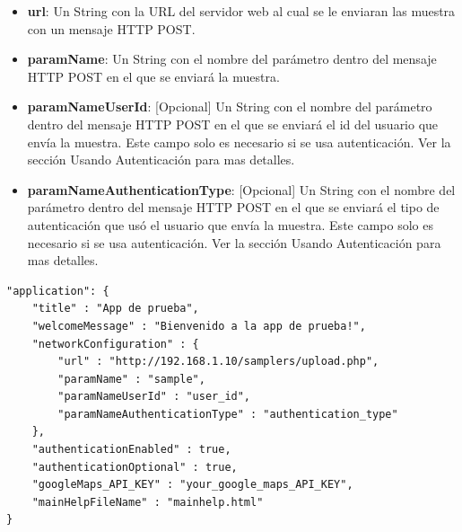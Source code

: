 	\begin{itemize}
	
		\item \textbf{url}: Un String con la URL del servidor web al cual se le enviaran las muestra con un mensaje HTTP POST.
		
		\item \textbf{paramName}: Un String con el nombre del parámetro dentro del mensaje HTTP POST en el que se enviará la muestra.
	
		\item \textbf{paramNameUserId}: [Opcional] Un String con el nombre del parámetro dentro del mensaje HTTP POST en el que se enviará el id del usuario que envía la muestra. Este campo solo es necesario si se usa autenticación. Ver la sección Usando Autenticación para mas detalles.
		
		\item \textbf{paramNameAuthenticationType}: [Opcional] Un String con el nombre del parámetro dentro del mensaje HTTP POST en el que se enviará el tipo de autenticación que usó el usuario que envía la muestra. Este campo solo es necesario si se usa autenticación. Ver la sección Usando Autenticación para mas detalles.
	
	\end{itemize}
	

\begin{lstlisting}[language=XML, frame=tlbr, caption=Ejemplo del objeto application.]
"application": {
	"title" : "App de prueba",
	"welcomeMessage" : "Bienvenido a la app de prueba!",
	"networkConfiguration" : {
		"url" : "http://192.168.1.10/samplers/upload.php",
		"paramName" : "sample",
		"paramNameUserId" : "user_id",
		"paramNameAuthenticationType" : "authentication_type"
	},
	"authenticationEnabled" : true,
	"authenticationOptional" : true,
	"googleMaps_API_KEY" : "your_google_maps_API_KEY",
	"mainHelpFileName" : "mainhelp.html"
}
\end{lstlisting}
	
